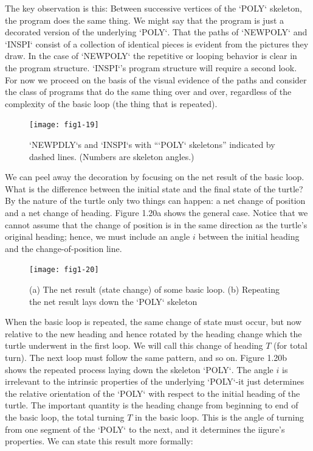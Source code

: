 \documentclass{book}
\begin{document}
The key observation is this: Between successive vertices of the \textsc{`POLY`}
skeleton, the program does the same thing. We might say that the
program is just a decorated version of the underlying \textsc{`POLY`}. That the
paths of \textsc{`NEWPOLY`} and \textsc{`INSPI`} consist of a collection of identical pieces
is evident from the pictures they draw. In the case of \textsc{`NEWPOLY`} the
repetitive or looping behavior is clear in the program structure. \textsc{`INSPI`}'s
program structure will require a second look. For now we proceed on
the basis of the visual evidence of the paths and consider the class
of programs that do the same thing over and over, regardless of the
complexity of the basic loop (the thing that is repeated).

\begin{figure}
\begin{center}
\texttt{[image: fig1-19]}
\caption{\textsc{`NEWPDLY`}s and \textsc{`INSPI`}s with ``\textsc{`POLY`} skeletons'' indicated by dashed lines. (Numbers are skeleton angles.)}
\end{center}
\end{figure}

We can peel away the decoration by focusing on the net result of the
basic loop. What is the difference between the initial state and the final
state of the turtle? By the nature of the turtle only two things can
happen: a net change of position and a net change of heading. Figure
1.20a shows the general case. Notice that we cannot assume that the
change of position is in the same direction as the turtle's original heading;
hence, we must include an angle $i$ between the initial heading and the
change-of-position line.

\begin{figure}
\begin{center}
\texttt{[image: fig1-20]}
\caption{(a) The net result (state change) of some basic loop. (b) Repeating the net result
lays down the \textsc{`POLY`} skeleton}
\end{center}
\end{figure}

When the basic loop is repeated, the same change of state must occur,
but now relative to the new heading and hence rotated by the heading
change which the turtle underwent in the first loop. We will call this
change of heading $T$ (for total turn). The next loop must follow the same
pattern, and so on. Figure 1.20b shows the repeated process laying down
the skeleton \textsc{`POLY`}. The angle $i$ is irrelevant to the intrinsic properties of
the underlying \textsc{`POLY`}-it just determines the relative orientation of the
\textsc{`POLY`} with respect to the initial heading of the turtle. The important
quantity is the heading change from beginning to end of the basic loop,
the total turning $T$ in the basic loop. This is the angle of turning from
one segment of the \textsc{`POLY`} to the next, and it determines the iigure's
properties. We can state this result more formally:
\end{document}

